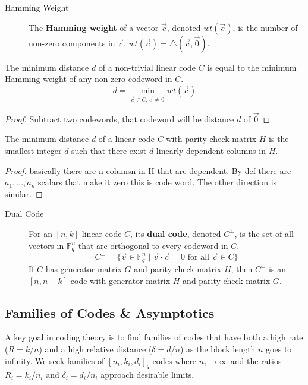 \begin{description}
    \item[Hamming Weight] The \textbf{Hamming weight} of a vector $\vec{c}$, denoted $wt(\vec{c})$, is the number of non-zero components in $\vec{c}$. $wt(\vec{c}) = \triangle(\vec{c}, \vec{0})$.
\end{description}

\begin{theorem}
    The minimum distance $d$ of a non-trivial linear code $C$ is equal to the minimum Hamming weight of any non-zero codeword in $C$.
    \[
        d = \min_{\vec{c} \in C, \vec{c} \neq \vec{0}} wt(\vec{c})
    \]
\end{theorem}
\begin{proof}
    Subtract two codewords, that codeword will be distance $d$ of $\vec{0}$ 
\end{proof}

\begin{theorem}
    The minimum distance $d$ of a linear code $C$ with parity-check matrix $H$ is the smallest integer $d$ such that there exist $d$ linearly dependent columns in $H$.
\end{theorem}
\begin{proof}
    basically there are n columsn in H that are dependent. By def there are $a_1, ..., a_n$ scalars that make it zero this is code word. The other direction is similar.
\end{proof}

\begin{description}
    \item[Dual Code] For an $[n, k]$ linear code $C$, its \textbf{dual code}, denoted $C^\perp$, is the set of all vectors in $\mathbb{F}_q^n$ that are orthogonal to every codeword in $C$.
    \[
        C^\perp = \{ \vec{v} \in \mathbb{F}_q^n \mid \vec{v} \cdot \vec{c} = 0 \text{ for all } \vec{c} \in C \}
    \]
    If $C$ has generator matrix $G$ and parity-check matrix $H$, then $C^\perp$ is an $[n, n-k]$ code with generator matrix $H$ and parity-check matrix $G$.
\end{description}

\subsection{Families of Codes \& Asymptotics}

    A key goal in coding theory is to find families of codes that have both a high rate ($R=k/n$) and a high relative distance ($\delta=d/n$) as the block length $n$ goes to infinity. We seek families of $[n_i, k_i, d_i]_q$ codes where $n_i \to \infty$ and the ratios $R_i = k_i/n_i$ and $\delta_i = d_i/n_i$ approach desirable limits.

